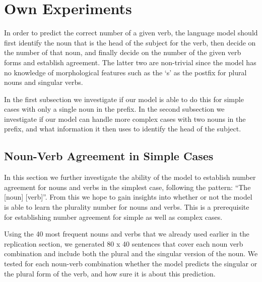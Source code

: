 \section{Own Experiments}
\label{own-experiments}
In order to predict the correct number of a given verb,
the language model should first
identify the noun that is the head of the subject for the verb,
then decide on the number of that noun,
and finally decide on the number of the given verb forms and
establish agreement.
The latter two are non-trivial since the model has no knowledge
of morphological features such as the `s' as the postfix
for plural nouns and singular verbs. 

In the first subsection we investigate if our model is able to
do this for simple cases with only a single noun in the prefix.
%
In the second subsection we investigate if our model can handle
more complex cases with two nouns in the prefix,
and what information it then uses to identify the head of the subject.


\subsection{Noun-Verb Agreement in Simple Cases}

In this section we further investigate the ability of the model to
establish number agreement for nouns and verbs in the simplest case,
following the pattern: ``The [noun] [verb]''. 
From this we hope to gain insights into whether or not the model is able 
to learn the plurality number for nouns and verbs.
This is a prerequisite for establishing number agreement
for simple as well as complex cases.

Using the 40 most frequent nouns and verbs that we already used earlier in the replication section, we generated 80 x 40 sentences that cover each noun verb combination and include both the plural and the singular version of the noun. 
We tested for each noun-verb combination whether the model 
predicts the singular or the plural form of the verb,
and how sure it is about this prediction.

